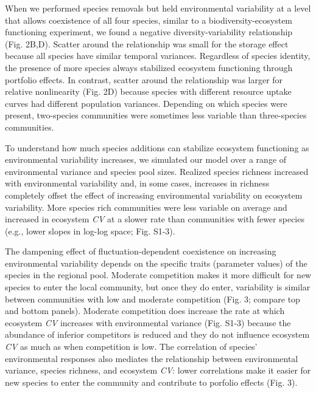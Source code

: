 \documentclass[12pt,]{article}
\begin{document}
When we performed species removals but held environmental variability at
a level that allows coexistence of all four species, similar to a
biodiversity-ecosystem functioning experiment, we found a negative
diversity-variability relationship (Fig. 2B,D). Scatter around the
relationship was small for the storage effect because all species have
similar temporal variances. Regardless of species identity, the presence
of more species always stabilized ecosystem functioning through
portfolio effects. In contrast, scatter around the relationship was
larger for relative nonlinearity (Fig. 2D) because species with
different resource uptake curves had different population variances.
Depending on which species were present, two-species communities were
sometimes less variable than three-species communities.

To understand how much species additions can stabilize ecosystem
functioning as environmental variability increases, we simulated our
model over a range of environmental variance and species pool sizes.
Realized species richness increased with environmental variability and,
in some cases, increases in richness completely offset the effect of
increasing environmental variability on ecosystem variability. More
species rich communities were less variable on average and increased in
ecosystem \emph{CV} at a slower rate than communities with fewer species
(e.g., lower slopes in log-log space; Fig. S1-3).

The dampening effect of fluctuation-dependent coexistence on increasing
environmental variability depends on the specific traits (parameter
values) of the species in the regional pool. Moderate competition makes
it more difficult for new species to enter the local community, but once
they do enter, variability is similar between communities with low and
moderate competition (Fig. 3; compare top and bottom panels). Moderate
competition does increase the rate at which ecosystem \emph{CV}
increases with environmental variance (Fig. S1-3) because the abundance
of inferior competitors is reduced and they do not influence ecosystem
\emph{CV} as much as when competition is low. The correlation of
species' environmental responses also mediates the relationship between
environmental variance, species richness, and ecosystem \emph{CV}: lower
correlations make it easier for new species to enter the community and
contribute to porfolio effects (Fig. 3).
\end{document}
